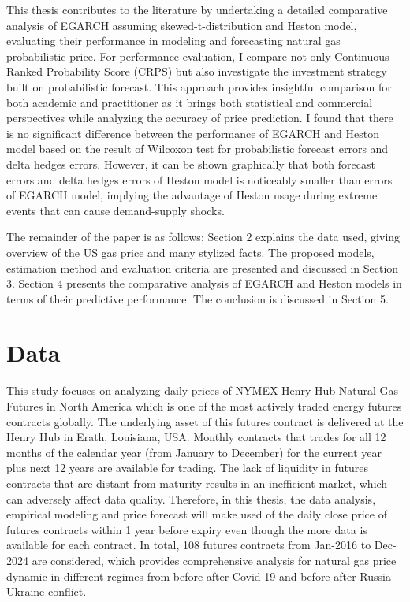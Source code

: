 \documentclass[12pt,a4paper]{article}
\numberwithin{equation}{section}
\begin{document}
This thesis contributes to the literature by undertaking a detailed comparative analysis of EGARCH assuming skewed-t-distribution and Heston model, evaluating their performance in modeling and forecasting natural gas probabilistic price. For performance evaluation, I compare not only Continuous Ranked Probability Score (CRPS) but also investigate the investment strategy built on probabilistic forecast. This approach provides insightful comparison for both academic and practitioner as it brings both statistical and commercial perspectives while analyzing the accuracy of price prediction. I found that there is no significant difference between the performance of EGARCH and Heston model based on the result of Wilcoxon test for probabilistic forecast errors and delta hedges errors. However, it can be shown graphically that both forecast errors and delta hedges errors of Heston model is noticeably smaller than errors of EGARCH model, implying the advantage of Heston usage during extreme events that can cause demand-supply shocks.

The remainder of the paper is as follows: Section 2 explains the data used, giving overview of the US gas price and many stylized facts. The proposed models, estimation method and evaluation criteria are presented and discussed in Section 3. Section 4 presents the comparative analysis of EGARCH and Heston models in terms of their predictive performance. The conclusion is discussed in Section 5.

\section{Data}

This study focuses on analyzing daily prices of NYMEX Henry Hub Natural Gas Futures in North America which is one of the most actively traded energy futures contracts globally. The underlying asset of this futures contract is delivered at the Henry Hub in Erath, Louisiana, USA. Monthly contracts that trades for all 12 months of the calendar year (from January to December) for the current year plus next 12 years are available for trading. The lack of liquidity in futures contracts that are distant from maturity results in an inefficient market, which can adversely affect data quality. Therefore, in this thesis, the data analysis, empirical modeling and price forecast will make used of the daily close price of futures contracts within 1 year before expiry even though the more data is available for each contract. In total, 108 futures contracts from Jan-2016 to Dec-2024 are considered, which provides comprehensive analysis for natural gas price dynamic in different regimes from before-after Covid 19 and before-after Russia-Ukraine conflict. 
\end{document}
